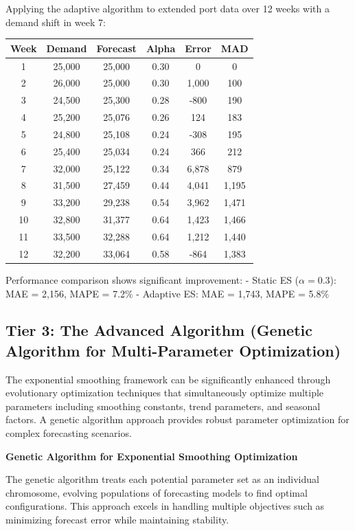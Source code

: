 \documentclass{article}
\begin{document}
Applying the adaptive algorithm to extended port data over 12 weeks with a demand shift in week 7:

\begin{center}
\begin{tabular}{|c|c|c|c|c|c|}
\hline
\textbf{Week} & \textbf{Demand} & \textbf{Forecast} & \textbf{Alpha} & \textbf{Error} & \textbf{MAD} \\
\hline
1 & 25,000 & 25,000 & 0.30 & 0 & 0 \\
2 & 26,000 & 25,000 & 0.30 & 1,000 & 100 \\
3 & 24,500 & 25,300 & 0.28 & -800 & 190 \\
4 & 25,200 & 25,076 & 0.26 & 124 & 183 \\
5 & 24,800 & 25,108 & 0.24 & -308 & 195 \\
6 & 25,400 & 25,034 & 0.24 & 366 & 212 \\
7 & 32,000 & 25,122 & 0.34 & 6,878 & 879 \\
8 & 31,500 & 27,459 & 0.44 & 4,041 & 1,195 \\
9 & 33,200 & 29,238 & 0.54 & 3,962 & 1,471 \\
10 & 32,800 & 31,377 & 0.64 & 1,423 & 1,466 \\
11 & 33,500 & 32,288 & 0.64 & 1,212 & 1,440 \\
12 & 32,200 & 33,064 & 0.58 & -864 & 1,383 \\
\hline
\end{tabular}
\end{center}

Performance comparison shows significant improvement:
- Static ES ($\alpha = 0.3$): MAE = 2,156, MAPE = 7.2\%
- Adaptive ES: MAE = 1,743, MAPE = 5.8\%

\subsection{Tier 3: The Advanced Algorithm (Genetic Algorithm for Multi-Parameter Optimization)}

The exponential smoothing framework can be significantly enhanced through evolutionary optimization techniques that simultaneously optimize multiple parameters including smoothing constants, trend parameters, and seasonal factors. A genetic algorithm approach provides robust parameter optimization for complex forecasting scenarios.

\textbf{Genetic Algorithm for Exponential Smoothing Optimization}

The genetic algorithm treats each potential parameter set as an individual chromosome, evolving populations of forecasting models to find optimal configurations. This approach excels in handling multiple objectives such as minimizing forecast error while maintaining stability.
\end{document}
